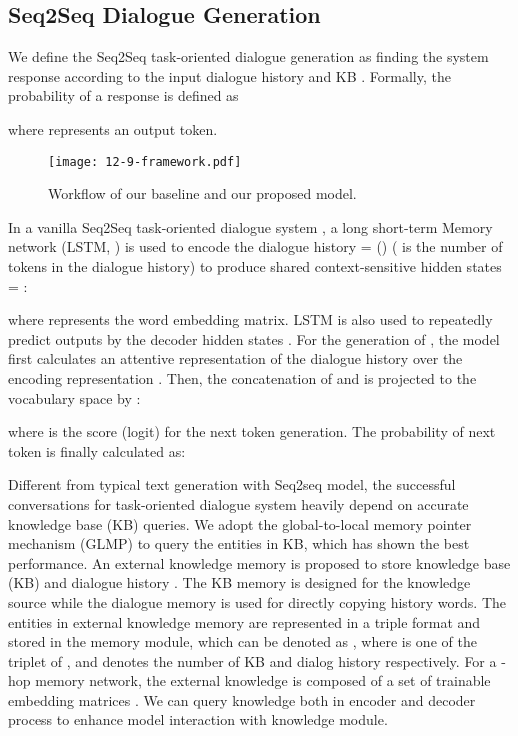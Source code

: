 \documentclass[11pt,a4paper]{article}
\begin{document}
\subsection{Seq2Seq Dialogue Generation} \label{sec:seq2seq}
We define the Seq2Seq task-oriented dialogue generation
as finding the system response 
according to the input dialogue history  and KB .
Formally, the probability of a response is defined as

where  represents an output token.
\begin{figure}[t]
	\centering
\texttt{[image: 12-9-framework.pdf]}
	\caption{
		Workflow of our baseline and our proposed model.
	}
	\label{fig:framework}
\end{figure}
In a vanilla Seq2Seq task-oriented dialogue system \cite{eric-manning-2017-copy}, a long short-term Memory network (LSTM, )  is used to encode the dialogue history
 = ()  ( is the 
number of tokens in the dialogue history) to produce shared context-sensitive  hidden states  =  :

where  represents the word embedding matrix. LSTM is also used to repeatedly predict outputs  by the decoder hidden states .
For the generation of , the model
first calculates an attentive representation  of the dialogue history over the encoding representation .
Then, the concatenation of  
and  
is projected to the vocabulary space  by :

where  is the score (logit) for the next token generation.
The probability of next token  is finally calculated as:

Different from typical text generation with Seq2seq model, the successful conversations for task-oriented dialogue system heavily depend on accurate knowledge base (KB) queries.
We adopt the global-to-local memory pointer mechanism (GLMP) \cite{DBLP:conf/iclr/WuSX19} to query the entities in KB, which has shown the best performance. 
An external knowledge memory is proposed to store  knowledge base (KB)  and dialogue history .
The KB memory is designed for the knowledge source while the dialogue memory is used for directly copying history words.
The entities in external knowledge memory are represented in a triple format and stored in the memory module, which can be denoted as , where  is one of the triplet of ,  and  denotes the number of KB and dialog history respectively.
For a -hop memory network, the external knowledge is composed of a set of trainable embedding matrices .
We can query knowledge both in encoder and decoder process to enhance model interaction with knowledge module.
\end{document}
